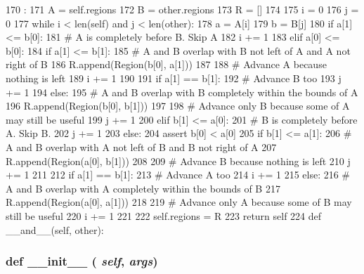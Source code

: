 \begin{DoxyCode}
170                              :
171         A = self.regions
172         B = other.regions
173         R = []
174 
175         i = 0
176         j = 0
177         while i < len(self) and j < len(other):
178             a = A[i]
179             b = B[j]
180             if a[1] <= b[0]:
181                 # A is completely before B.  Skip A
182                 i += 1
183             elif a[0] <= b[0]:
184                 if a[1] <= b[1]:
185                     # A and B overlap with B not left of A and A not right of B
186                     R.append(Region(b[0], a[1]))
187 
188                     # Advance A because nothing is left
189                     i += 1
190 
191                     if a[1] == b[1]:
192                         # Advance B too
193                         j += 1
194                 else:
195                     # A and B overlap with B completely within the bounds of A
196                     R.append(Region(b[0], b[1]))
197 
198                     # Advance only B because some of A may still be useful
199                     j += 1
200             elif b[1] <= a[0]:
201                 # B is completely before A. Skip B.
202                 j += 1
203             else:
204                 assert b[0] < a[0]
205                 if b[1] <= a[1]:
206                     # A and B overlap with A not left of B and B not right of A
207                     R.append(Region(a[0], b[1]))
208 
209                     # Advance B because nothing is left
210                     j += 1
211 
212                     if a[1] == b[1]:
213                         # Advance A too
214                         i += 1
215                 else:
216                     # A and B overlap with A completely within the bounds of B
217                     R.append(Region(a[0], a[1]))
218 
219                     # Advance only A because some of B may still be useful
220                     i += 1
221 
222         self.regions = R
223         return self
224 
    def __and__(self, other):
\end{DoxyCode}
\hypertarget{classm5_1_1util_1_1region_1_1Regions_ac775ee34451fdfa742b318538164070e}{
\subsubsection[{\_\-\_\-init\_\-\_\-}]{\setlength{\rightskip}{0pt plus 5cm}def \_\-\_\-init\_\-\_\- ( {\em self}, \/   {\em args})}}
\label{classm5_1_1util_1_1region_1_1Regions_ac775ee34451fdfa742b318538164070e}



